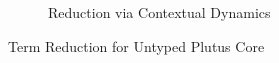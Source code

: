 \documentclass[../plutus-core-specification.tex]{subfiles}
\begin{document}
\begin{figure}[H]
\begin{subfigure}[c]{\linewidth}
    \begin{prooftree}
    \end{prooftree}

    \begin{prooftree}
    \end{prooftree}

    \caption{Reduction via Contextual Dynamics}
    \label{fig:untyped-reduction}
\end{subfigure}
\caption{Term Reduction for Untyped Plutus Core}
\label{fig:untyped-term-reduction}
\end{figure}
\end{document}
